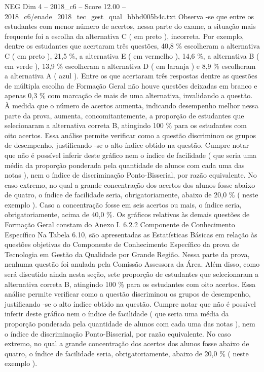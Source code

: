 \begin{textsample}{NEG Dim 4 – 2018\_c6 – Score 12.00 – 2018\_c6/enade\_2018\_tec\_gest\_qual\_bbbd005b4c.txt}
Observa -se que entre os estudantes com menor número de acertos, nessa parte do exame, a situação mais frequente foi a escolha da alternativa C ( em preto ), incorreta.
Por exemplo, dentre os estudantes que acertaram três questões, 40,8 \% escolheram a alternativa C ( em preto ), 21,5 \%, a alternativa E ( em vermelho ), 14,6 \%, a alternativa B ( em verde ), 13,9 \% escolheram a alternativa D ( em laranja ) e 8,9 \% escolheram a alternativa A ( azul ).
Entre os que acertaram três respostas dentre as questões de múltipla escolha de Formação Geral não houve questões deixadas em branco e apenas 0,3 \% com marcação de mais de uma alternativa, invalidando a questão.
À medida que o número de acertos aumenta, indicando desempenho melhor nessa parte da prova, aumenta, concomitantemente, a proporção de estudantes que selecionaram a alternativa correta B, atingindo 100 \% para os estudantes com oito acertos.
Essa análise permite verificar como a questão discriminou os grupos de desempenho, justificando -se o alto índice obtido na questão.
Cumpre notar que não é possível inferir deste gráfico nem o índice de facilidade ( que seria uma média da proporção ponderada pela quantidade de alunos com cada uma das notas ), nem o índice de discriminação Ponto-Bisserial, por razão equivalente.
No caso extremo, no qual a grande concentração dos acertos dos alunos fosse abaixo de quatro, o índice de facilidade seria, obrigatoriamente, abaixo de 20,0 \% ( neste exemplo ).
Caso a concentração fosse em seis acertos ou mais, o índice seria, obrigatoriamente, acima de 40,0 \%.
Os gráficos relativos às demais questões de Formação Geral constam do Anexo I. 6.2.2 Componente de Conhecimento Específico Na Tabela 6.10, são apresentadas as Estatísticas Básicas em relação às questões objetivas do Componente de Conhecimento Específico da prova de Tecnologia em Gestão da Qualidade por Grande Região.
Nessa parte da prova, nenhuma questão foi anulada pela Comissão Assessora da Área.
Além disso, como será discutido ainda nesta seção, sete proporção de estudantes que selecionaram a alternativa correta B, atingindo 100 \% para os estudantes com oito acertos.
Essa análise permite verificar como a questão discriminou os grupos de desempenho, justificando -se o alto índice obtido na questão.
Cumpre notar que não é possível inferir deste gráfico nem o índice de facilidade ( que seria uma média da proporção ponderada pela quantidade de alunos com cada uma das notas ), nem o índice de discriminação Ponto-Bisserial, por razão equivalente.
No caso extremo, no qual a grande concentração dos acertos dos alunos fosse abaixo de quatro, o índice de facilidade seria, obrigatoriamente, abaixo de 20,0 \% ( neste exemplo ).

\end{textsample}
